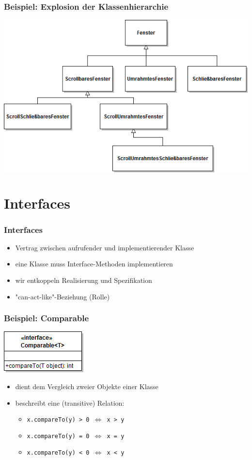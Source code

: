 \documentclass[12pt]{beamer}
\begin{document}
\begin{frame}
	\frametitle{Beispiel: Explosion der Klassenhierarchie}
	\centerline{\includegraphics[scale=0.5]{src/img/Fenster}}
\end{frame}

\section{Interfaces}

\begin{frame}
	\frametitle{Interfaces}
	\begin{itemize}
		\item Vertrag zwischen aufrufender und implementierender Klasse
		\item eine Klasse muss Interface-Methoden implementieren
		\item wir entkoppeln Realisierung und Spezifikation
		\item "can-act-like"-Beziehung (Rolle)
	\end{itemize}
\end{frame}

\begin{frame}
	\frametitle{Beispiel: Comparable}

	\centerline{\includegraphics[scale=0.5]{src/img/Comparable}}
	\vspace{5mm}
	\begin{itemize}
		\item dient dem Vergleich zweier Objekte einer Klasse
		\item beschreibt eine (transitive) Relation:
			\begin{itemize}
				\item \texttt{x.compareTo(y) > 0 \(\Leftrightarrow\) x > y}
				\item \texttt{x.compareTo(y) = 0 \(\Leftrightarrow\) x = y}
				\item \texttt{x.compareTo(y) < 0 \(\Leftrightarrow\) x < y}
			\end{itemize}
	\end{itemize}
\end{frame}
\end{document}
